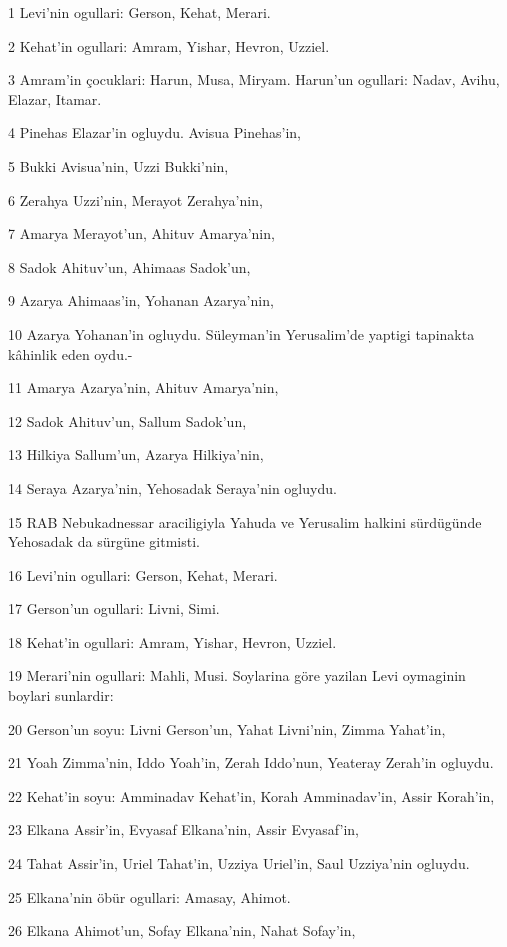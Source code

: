 \par 1 Levi'nin ogullari: Gerson, Kehat, Merari.
\par 2 Kehat'in ogullari: Amram, Yishar, Hevron, Uzziel.
\par 3 Amram'in çocuklari: Harun, Musa, Miryam. Harun'un ogullari: Nadav, Avihu, Elazar, Itamar.
\par 4 Pinehas Elazar'in ogluydu. Avisua Pinehas'in,
\par 5 Bukki Avisua'nin, Uzzi Bukki'nin,
\par 6 Zerahya Uzzi'nin, Merayot Zerahya'nin,
\par 7 Amarya Merayot'un, Ahituv Amarya'nin,
\par 8 Sadok Ahituv'un, Ahimaas Sadok'un,
\par 9 Azarya Ahimaas'in, Yohanan Azarya'nin,
\par 10 Azarya Yohanan'in ogluydu. Süleyman'in Yerusalim'de yaptigi tapinakta kâhinlik eden oydu.-
\par 11 Amarya Azarya'nin, Ahituv Amarya'nin,
\par 12 Sadok Ahituv'un, Sallum Sadok'un,
\par 13 Hilkiya Sallum'un, Azarya Hilkiya'nin,
\par 14 Seraya Azarya'nin, Yehosadak Seraya'nin ogluydu.
\par 15 RAB Nebukadnessar araciligiyla Yahuda ve Yerusalim halkini sürdügünde Yehosadak da sürgüne gitmisti.
\par 16 Levi'nin ogullari: Gerson, Kehat, Merari.
\par 17 Gerson'un ogullari: Livni, Simi.
\par 18 Kehat'in ogullari: Amram, Yishar, Hevron, Uzziel.
\par 19 Merari'nin ogullari: Mahli, Musi. Soylarina göre yazilan Levi oymaginin boylari sunlardir:
\par 20 Gerson'un soyu: Livni Gerson'un, Yahat Livni'nin, Zimma Yahat'in,
\par 21 Yoah Zimma'nin, Iddo Yoah'in, Zerah Iddo'nun, Yeateray Zerah'in ogluydu.
\par 22 Kehat'in soyu: Amminadav Kehat'in, Korah Amminadav'in, Assir Korah'in,
\par 23 Elkana Assir'in, Evyasaf Elkana'nin, Assir Evyasaf'in,
\par 24 Tahat Assir'in, Uriel Tahat'in, Uzziya Uriel'in, Saul Uzziya'nin ogluydu.
\par 25 Elkana'nin öbür ogullari: Amasay, Ahimot.
\par 26 Elkana Ahimot'un, Sofay Elkana'nin, Nahat Sofay'in,
